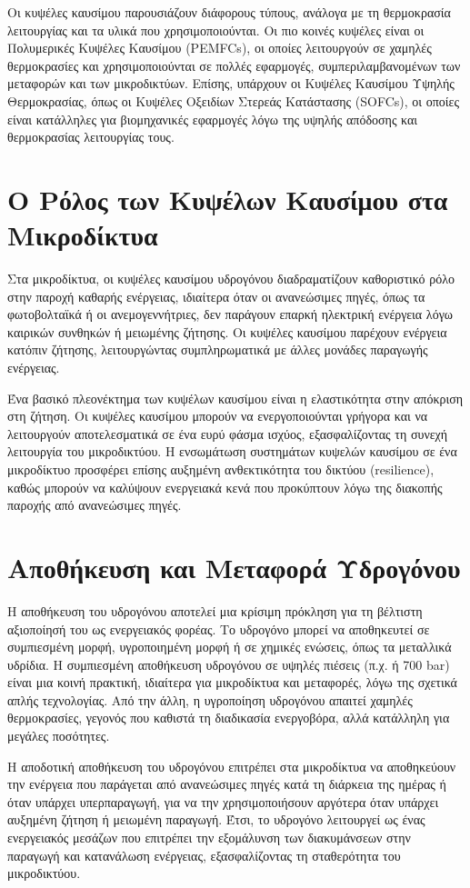 Οι κυψέλες καυσίμου παρουσιάζουν διάφορους τύπους, ανάλογα με τη θερμοκρασία λειτουργίας και τα υλικά που χρησιμοποιούνται. Οι πιο κοινές κυψέλες είναι οι Πολυμερικές Κυψέλες Καυσίμου (\en PEMFCs), \gr οι οποίες λειτουργούν σε χαμηλές θερμοκρασίες και χρησιμοποιούνται σε πολλές εφαρμογές, συμπεριλαμβανομένων των μεταφορών και των μικροδικτύων. Επίσης, υπάρχουν οι Κυψέλες Καυσίμου Υψηλής Θερμοκρασίας, όπως οι Κυψέλες Οξειδίων Στερεάς Κατάστασης (\en SOFCs), \gr οι οποίες είναι κατάλληλες για βιομηχανικές εφαρμογές λόγω της υψηλής απόδοσης και θερμοκρασίας λειτουργίας τους.

\section{Ο Ρόλος των Κυψέλων Καυσίμου στα Μικροδίκτυα}
Στα μικροδίκτυα, οι κυψέλες καυσίμου υδρογόνου διαδραματίζουν καθοριστικό ρόλο στην παροχή καθαρής ενέργειας, ιδιαίτερα όταν οι ανανεώσιμες πηγές, όπως τα φωτοβολταϊκά ή οι ανεμογεννήτριες, δεν παράγουν επαρκή ηλεκτρική ενέργεια λόγω καιρικών συνθηκών ή μειωμένης ζήτησης. Οι κυψέλες καυσίμου παρέχουν ενέργεια κατόπιν ζήτησης, λειτουργώντας συμπληρωματικά με άλλες μονάδες παραγωγής ενέργειας.

Ένα βασικό πλεονέκτημα των κυψέλων καυσίμου είναι η ελαστικότητα στην απόκριση στη ζήτηση. Οι κυψέλες καυσίμου μπορούν να ενεργοποιούνται γρήγορα και να λειτουργούν αποτελεσματικά σε ένα ευρύ φάσμα ισχύος, εξασφαλίζοντας τη συνεχή λειτουργία του μικροδικτύου. Η ενσωμάτωση συστημάτων κυψελών καυσίμου σε ένα μικροδίκτυο προσφέρει επίσης αυξημένη ανθεκτικότητα του δικτύου (\en resilience), \gr καθώς μπορούν να καλύψουν ενεργειακά κενά που προκύπτουν λόγω της διακοπής παροχής από ανανεώσιμες πηγές.

\section{Αποθήκευση και Μεταφορά Υδρογόνου}
Η αποθήκευση του υδρογόνου αποτελεί μια κρίσιμη πρόκληση για τη βέλτιστη αξιοποίησή του ως ενεργειακός φορέας. Το υδρογόνο μπορεί να αποθηκευτεί σε συμπιεσμένη μορφή, υγροποιημένη μορφή ή σε χημικές ενώσεις, όπως τα μεταλλικά υδρίδια. Η συμπιεσμένη αποθήκευση υδρογόνου σε υψηλές πιέσεις (π.χ.  ή 700 bar) \gr είναι μια κοινή πρακτική, ιδιαίτερα για μικροδίκτυα και μεταφορές, λόγω της σχετικά απλής τεχνολογίας. Από την άλλη, η υγροποίηση υδρογόνου απαιτεί χαμηλές θερμοκρασίες, γεγονός που καθιστά τη διαδικασία ενεργοβόρα, αλλά κατάλληλη για μεγάλες ποσότητες.

Η αποδοτική αποθήκευση του υδρογόνου επιτρέπει στα μικροδίκτυα να αποθηκεύουν την ενέργεια που παράγεται από ανανεώσιμες πηγές κατά τη διάρκεια της ημέρας ή όταν υπάρχει υπερπαραγωγή, για να την χρησιμοποιήσουν αργότερα όταν υπάρχει αυξημένη ζήτηση ή μειωμένη παραγωγή. Έτσι, το υδρογόνο λειτουργεί ως ένας ενεργειακός μεσάζων που επιτρέπει την εξομάλυνση των διακυμάνσεων στην παραγωγή και κατανάλωση ενέργειας, εξασφαλίζοντας τη σταθερότητα του μικροδικτύου.
